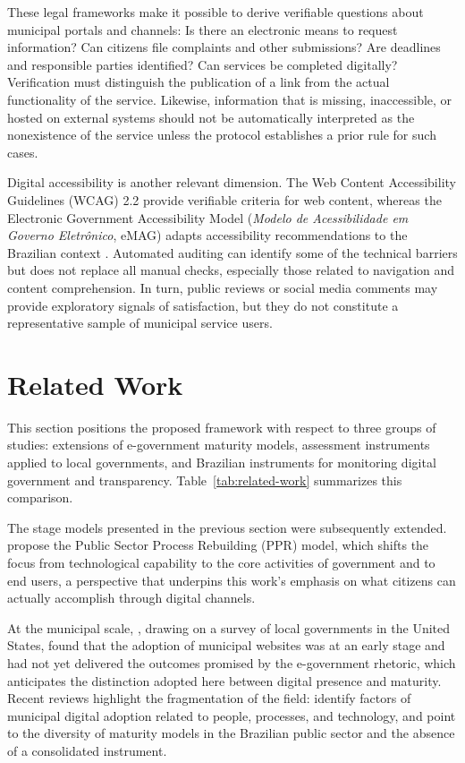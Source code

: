\documentclass[12pt]{article}
\begin{document}
These legal frameworks make it possible to derive verifiable questions about municipal portals and channels: Is there an electronic means to request information? Can citizens file complaints and other submissions? Are deadlines and responsible parties identified? Can services be completed digitally? Verification must distinguish the publication of a link from the actual functionality of the service. Likewise, information that is missing, inaccessible, or hosted on external systems should not be automatically interpreted as the nonexistence of the service unless the protocol establishes a prior rule for such cases.

Digital accessibility is another relevant dimension. The Web Content Accessibility Guidelines (WCAG) 2.2 provide verifiable criteria for web content, whereas the Electronic Government Accessibility Model (\textit{Modelo de Acessibilidade em Governo Eletrônico}, eMAG) adapts accessibility recommendations to the Brazilian context \cite{w3c2023wcag22, brasil2014emag}. Automated auditing can identify some of the technical barriers but does not replace all manual checks, especially those related to navigation and content comprehension. In turn, public reviews or social media comments may provide exploratory signals of satisfaction, but they do not constitute a representative sample of municipal service users.

\section{Related Work}

This section positions the proposed framework with respect to three groups of studies: extensions of e-government maturity models, assessment instruments applied to local governments, and Brazilian instruments for monitoring digital government and transparency. Table~\ref{tab:related-work} summarizes this comparison.

The stage models presented in the previous section were subsequently extended. \cite{andersen2006egovernment} propose the Public Sector Process Rebuilding (PPR) model, which shifts the focus from technological capability to the core activities of government and to end users, a perspective that underpins this work's emphasis on what citizens can actually accomplish through digital channels. 

At the municipal scale, \cite{moon2002evolution}, drawing on a survey of local governments in the United States, found that the adoption of municipal websites was at an early stage and had not yet delivered the outcomes promised by the e-government rhetoric, which anticipates the distinction adopted here between digital presence and maturity. Recent reviews highlight the fragmentation of the field: \cite{david2023understanding} identify factors of municipal digital adoption related to people, processes, and technology, and \cite{vieira2026modelos} point to the diversity of maturity models in the Brazilian public sector and the absence of a consolidated instrument.
\end{document}
